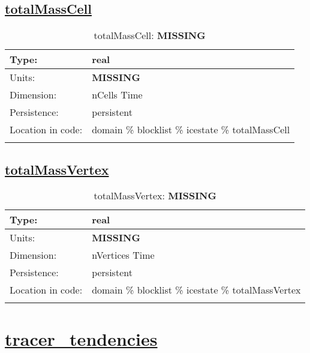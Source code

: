 \subsection[totalMassCell]{\hyperref[sec:var_tab_icestate]{totalMassCell}}
\label{subsec:var_sec_icestate_totalMassCell}
\begin{center}
\begin{longtable}{| p{2.0in} | p{4.0in} |}
        \hline 
        Type: & real \\
        \hline 
        Units: & {\bf \color{red} MISSING} \\
        \hline 
        Dimension: & nCells Time \\
        \hline 
        Persistence: & persistent \\
        \hline 
         Location in code: & domain \% blocklist \% icestate \% totalMassCell \\
         \hline 
    \caption{totalMassCell: {\bf \color{red} MISSING}}
\end{longtable}
\end{center}
\subsection[totalMassVertex]{\hyperref[sec:var_tab_icestate]{totalMassVertex}}
\label{subsec:var_sec_icestate_totalMassVertex}
\begin{center}
\begin{longtable}{| p{2.0in} | p{4.0in} |}
        \hline 
        Type: & real \\
        \hline 
        Units: & {\bf \color{red} MISSING} \\
        \hline 
        Dimension: & nVertices Time \\
        \hline 
        Persistence: & persistent \\
        \hline 
         Location in code: & domain \% blocklist \% icestate \% totalMassVertex \\
         \hline 
    \caption{totalMassVertex: {\bf \color{red} MISSING}}
\end{longtable}
\end{center}
\section[tracer\_tendencies]{\hyperref[sec:var_tab_tracer_tendencies]{tracer\_tendencies}}
\label{sec:var_sec_tracer_tendencies}
